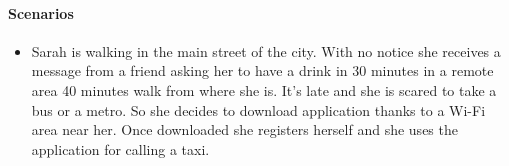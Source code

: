 \paragraph{Scenarios}
\begin{itemize}
	\item Sarah is walking in the main street of the city. With no notice she receives a message from a friend asking her to have a drink in 30 minutes in a remote area 40 minutes walk from where she is.
	It's late and she is scared to take a bus or a metro. So she decides to download \myTaxiService{} application thanks to a Wi-Fi area near her. Once downloaded she registers herself and she uses the application for calling a taxi.
\end{itemize}
